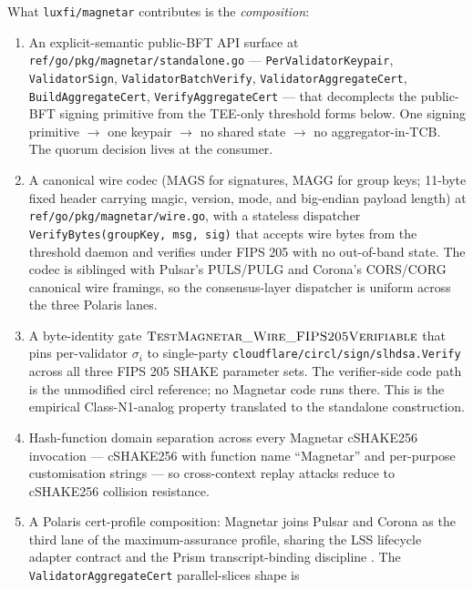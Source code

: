 What \texttt{luxfi/magnetar} contributes is the \emph{composition}:
\begin{enumerate}[leftmargin=2em,nosep]
  \item An explicit-semantic public-BFT API surface at
        \texttt{ref/go/pkg/magnetar/standalone.go} ---
        \texttt{PerValidatorKeypair}, \texttt{ValidatorSign},
        \texttt{ValidatorBatchVerify}, \texttt{ValidatorAggregateCert},
        \texttt{BuildAggregateCert}, \texttt{VerifyAggregateCert} ---
        that decomplects the public-BFT signing primitive from the
        TEE-only threshold forms below. One signing primitive
        $\to$ one keypair $\to$ no shared state $\to$ no
        aggregator-in-TCB. The quorum decision lives at the
        consumer.
  \item A canonical wire codec (MAGS for signatures, MAGG for
        group keys; 11-byte fixed header carrying magic, version,
        mode, and big-endian payload length) at
        \texttt{ref/go/pkg/magnetar/wire.go}, with a stateless
        dispatcher \texttt{VerifyBytes(groupKey, msg, sig)} that
        accepts wire bytes from the threshold daemon and verifies
        under FIPS 205 with no out-of-band state. The codec is
        siblinged with Pulsar's PULS/PULG and Corona's CORS/CORG
        canonical wire framings, so the consensus-layer dispatcher
        is uniform across the three Polaris lanes.
  \item A byte-identity gate
        $\textsc{TestMagnetar\_Wire\_FIPS205Verifiable}$ that pins
        per-validator $\sigma_i$ to single-party
        \texttt{cloudflare/circl/sign/slhdsa.Verify} across all three
        FIPS 205 SHAKE parameter sets. The verifier-side code path
        is the unmodified circl reference; no Magnetar code runs
        there. This is the empirical Class-N1-analog property
        translated to the standalone construction.
  \item Hash-function domain separation across every Magnetar
        cSHAKE256 invocation --- cSHAKE256 with function name
        ``Magnetar'' and per-purpose customisation strings ---
        so cross-context replay attacks reduce to cSHAKE256
        collision resistance.
  \item A Polaris cert-profile composition: Magnetar joins Pulsar
        and Corona as the third lane of the maximum-assurance
        profile, sharing the LSS lifecycle adapter contract
        \cite{luxlssmpc} and the Prism transcript-binding
        discipline \cite{lp073pulsarpaper}. The
        \texttt{ValidatorAggregateCert} parallel-slices shape is

\end{enumerate}
